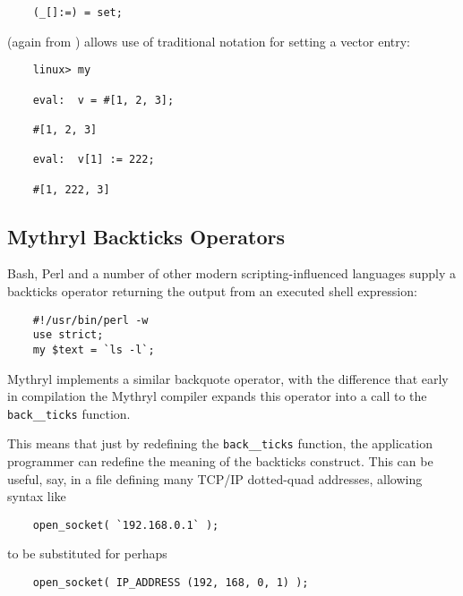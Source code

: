 \begin{verbatim}
    (_[]:=) = set;
\end{verbatim}

(again from ) 
allows use of traditional notation for setting a vector entry:

\begin{verbatim}
    linux> my

    eval:  v = #[1, 2, 3];

    #[1, 2, 3]

    eval:  v[1] := 222;

    #[1, 222, 3]

\end{verbatim}

\cutend*


\subsection{Mythryl Backticks Operators}

Bash, Perl and a number of other modern scripting-influenced languages 
supply a backticks operator returning the output from an executed 
shell expression:

\begin{verbatim}
    #!/usr/bin/perl -w
    use strict;
    my $text = `ls -l`;
\end{verbatim}

Mythryl implements a similar backquote operator, with the difference 
that early in compilation the Mythryl compiler expands this operator 
into a call to the {\tt back\_\_ticks} function.

This means that just by redefining the {\tt back\_\_ticks} function, the 
application programmer can redefine the meaning of the backticks 
construct.  This can be useful, say, in a file defining many TCP/IP 
dotted-quad addresses, allowing syntax like 

\begin{verbatim}
    open_socket( `192.168.0.1` );
\end{verbatim}

to be substituted for perhaps

\begin{verbatim}
    open_socket( IP_ADDRESS (192, 168, 0, 1) );
\end{verbatim}

